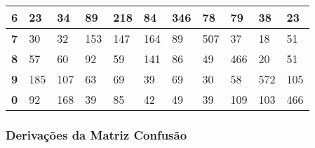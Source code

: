 \documentclass[a4paper]{article}
\begin{document}
\begin{table}[H]
\begin{tabular}{|l|l|l|l|l|l|l|l|l|l|l|}
        \textbf{6}                    & 23                          & 34                          & 89                          & 218                         & 84                          & 346                        & 78                          & 79                          & 38                          & 23                          \\ \hline
        \textbf{7}                    & \cellcolor[HTML]{FFFFFF}30  & \cellcolor[HTML]{FFFFFF}32  & \cellcolor[HTML]{FFFFFF}153 & \cellcolor[HTML]{FFFFFF}147 & \cellcolor[HTML]{FFFFFF}164 & \cellcolor[HTML]{FFFFFF}89 & \cellcolor[HTML]{FFFFFF}507 & \cellcolor[HTML]{FFFFFF}37  & \cellcolor[HTML]{FFFFFF}18  & \cellcolor[HTML]{FFFFFF}51  \\ \hline
        \textbf{8}                    & \cellcolor[HTML]{FFFFFF}57  & \cellcolor[HTML]{FFFFFF}60  & \cellcolor[HTML]{FFFFFF}92  & \cellcolor[HTML]{FFFFFF}59  & \cellcolor[HTML]{FFFFFF}141 & \cellcolor[HTML]{FFFFFF}86 & \cellcolor[HTML]{FFFFFF}49  & \cellcolor[HTML]{FFFFFF}466 & \cellcolor[HTML]{FFFFFF}20  & \cellcolor[HTML]{FFFFFF}51  \\ \hline
        \textbf{9}                    & \cellcolor[HTML]{FFFFFF}185 & \cellcolor[HTML]{FFFFFF}107 & \cellcolor[HTML]{FFFFFF}63  & \cellcolor[HTML]{FFFFFF}69  & \cellcolor[HTML]{FFFFFF}39  & \cellcolor[HTML]{FFFFFF}69 & \cellcolor[HTML]{FFFFFF}30  & \cellcolor[HTML]{FFFFFF}58  & \cellcolor[HTML]{FFFFFF}572 & \cellcolor[HTML]{FFFFFF}105 \\ \hline
        \textbf{0}                    & \cellcolor[HTML]{FFFFFF}92  & \cellcolor[HTML]{FFFFFF}168 & \cellcolor[HTML]{FFFFFF}39  & \cellcolor[HTML]{FFFFFF}85  & \cellcolor[HTML]{FFFFFF}42  & \cellcolor[HTML]{FFFFFF}49 & \cellcolor[HTML]{FFFFFF}39  & \cellcolor[HTML]{FFFFFF}109 & \cellcolor[HTML]{FFFFFF}103 & \cellcolor[HTML]{FFFFFF}466 \\ \hline
    \end{tabular}
\end{table}

\subsubsection{Derivações da Matriz Confusão}
\end{document}

